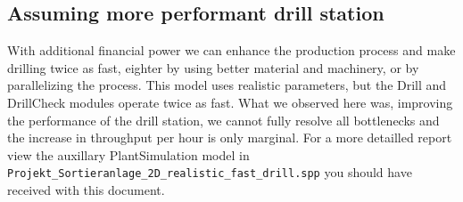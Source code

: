 \documentclass{report}
\begin{document}
\subsection{Assuming more performant drill station}
With additional financial power we can enhance the production process and make drilling twice as fast, 
eighter by using better material and machinery, or by parallelizing the process.
This model uses realistic parameters, but the Drill and DrillCheck modules operate twice as fast. What we observed here was, 
improving the performance of the drill station, we cannot fully resolve all bottlenecks and the increase in throughput per hour is only marginal.
For a more detailled report view the auxillary PlantSimulation model in\\\texttt{Projekt\_Sortieranlage\_2D\_realistic\_fast\_drill.spp} you should have received with this document.
\end{document}

